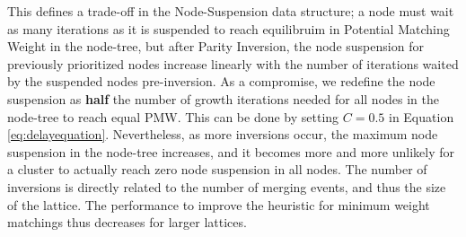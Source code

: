 This defines a trade-off in the Node-Suspension data structure; a node must wait as many iterations as it is suspended to reach equilibruim in Potential Matching Weight in the node-tree, but after Parity Inversion, the node suspension for previously prioritized nodes increase linearly with the number of iterations waited by the suspended nodes pre-inversion. As a compromise, we redefine the node suspension as \textbf{half} the number of growth iterations needed for all nodes in the node-tree to reach equal PMW. This can be done by setting $C=0.5$ in Equation \eqref{eq:delayequation}. Nevertheless, as more inversions occur, the maximum node suspension in the node-tree increases, and it becomes more and more unlikely for a cluster to actually reach zero node suspension in all nodes. The number of inversions is directly related to the number of merging events, and thus the size of the lattice. The performance to improve the heuristic for minimum weight matchings thus decreases for larger lattices. 

